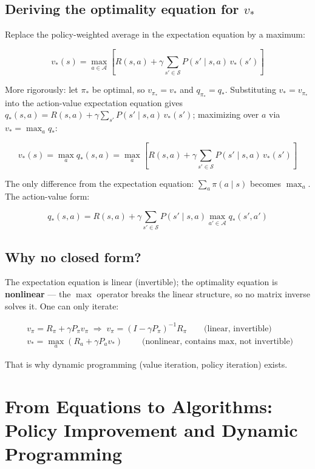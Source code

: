 \documentclass{article}
\begin{document}
\subsection*{Deriving the optimality equation for $v_*$}

Replace the policy-weighted average in the expectation equation by a maximum:

\[
\boxed{v_*(s) = \max_{a\in\mathcal{A}} \left[ R(s,a) + \gamma \sum_{s'\in\mathcal{S}} P(s'\mid s,a)\, v_*(s') \right]}
\]

More rigorously: let $\pi_*$ be optimal, so $v_{\pi_*}=v_*$ and $q_{\pi_*}=q_*$. Substituting $v_* = v_{\pi_*}$ into the action-value expectation equation gives $q_*(s,a) = R(s,a) + \gamma\sum_{s'}P(s'\mid s,a)\,v_*(s')$; maximizing over $a$ via $v_* = \max_a q_*$:

\[
v_*(s) = \max_a q_*(s,a) = \max_a \left[ R(s,a) + \gamma \sum_{s'\in\mathcal{S}} P(s'\mid s,a)\, v_*(s') \right]
\]

The only difference from the expectation equation: $\sum_a \pi(a\mid s)$ becomes $\max_a$. The action-value form:

\[
q_*(s,a) = R(s,a) + \gamma \sum_{s'\in\mathcal{S}} P(s'\mid s,a) \max_{a'\in\mathcal{A}} q_*(s',a')
\]

\subsection*{Why no closed form?}

The expectation equation is linear (invertible); the optimality equation is \textbf{nonlinear} --- the $\max$ operator breaks the linear structure, so no matrix inverse solves it. One can only iterate:

\[
\begin{aligned}
&v_\pi = R_\pi + \gamma P_\pi v_\pi \;\Longrightarrow\; v_\pi = (I-\gamma P_\pi)^{-1}R_\pi \qquad \text{(linear, invertible)}\\
&v_* = \max_a \left(R_a + \gamma P_a v_*\right) \qquad \text{(nonlinear, contains $\max$, not invertible)}
\end{aligned}
\]

That is why dynamic programming (value iteration, policy iteration) exists.

\section*{From Equations to Algorithms: Policy Improvement and Dynamic Programming}
\end{document}
